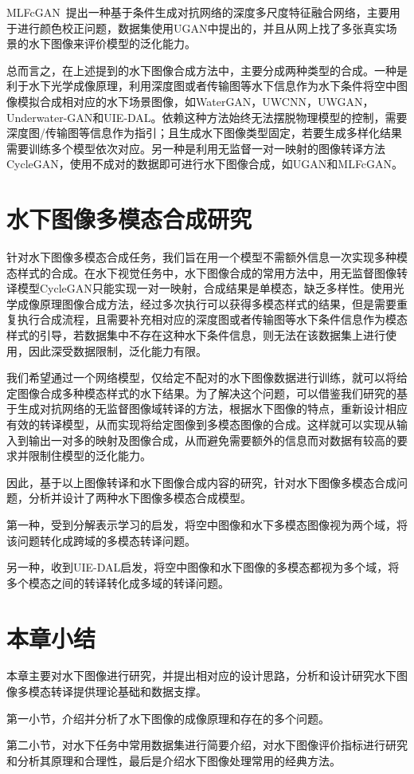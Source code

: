 MLFcGAN~\cite{liu2019mlfcgan}提出一种基于条件生成对抗网络的深度多尺度特征融合网络，主要用于进行颜色校正问题，数据集使用UGAN中提出的，并且从网上找了多张真实场景的水下图像来评价模型的泛化能力。

总而言之，在上述提到的水下图像合成方法中，主要分成两种类型的合成。一种是利于水下光学成像原理，利用深度图或者传输图等水下信息作为水下条件将空中图像模拟合成相对应的水下场景图像，如WaterGAN，UWCNN，UWGAN，Underwater-GAN和UIE-DAL。依赖这种方法始终无法摆脱物理模型的控制，需要深度图/传输图等信息作为指引；且生成水下图像类型固定，若要生成多样化结果需要训练多个模型依次对应。另一种是利用无监督一对一映射的图像转译方法CycleGAN，使用不成对的数据即可进行水下图像合成，如UGAN和MLFcGAN。

\section{水下图像多模态合成研究}
针对水下图像多模态合成任务，我们旨在用一个模型不需额外信息一次实现多种模态样式的合成。在水下视觉任务中，水下图像合成的常用方法中，用无监督图像转译模型CycleGAN只能实现一对一映射，合成结果是单模态，缺乏多样性。使用光学成像原理图像合成方法，经过多次执行可以获得多模态样式的结果，但是需要重复执行合成流程，且需要补充相对应的深度图或者传输图等水下条件信息作为模态样式的引导，若数据集中不存在这种水下条件信息，则无法在该数据集上进行使用，因此深受数据限制，泛化能力有限。

我们希望通过一个网络模型，仅给定不配对的水下图像数据进行训练，就可以将给定图像合成多种模态样式的水下结果。为了解决这个问题，可以借鉴我们研究的基于生成对抗网络的无监督图像域转译的方法，根据水下图像的特点，重新设计相应有效的转译模型，从而实现将给定图像到多模态图像的合成。这样就可以实现从输入到输出一对多的映射及图像合成，从而避免需要额外的信息而对数据有较高的要求并限制住模型的泛化能力。

因此，基于以上图像转译和水下图像合成内容的研究，针对水下图像多模态合成问题，分析并设计了两种水下图像多模态合成模型。

第一种，受到分解表示学习的启发，将空中图像和水下多模态图像视为两个域，将该问题转化成跨域的多模态转译问题。

另一种，收到UIE-DAL启发，将空中图像和水下图像的多模态都视为多个域，将多个模态之间的转译转化成多域的转译问题。


\section{本章小结}
本章主要对水下图像进行研究，并提出相对应的设计思路，分析和设计研究水下图像多模态转译提供理论基础和数据支撑。

第一小节，介绍并分析了水下图像的成像原理和存在的多个问题。

第二小节，对水下任务中常用数据集进行简要介绍，对水下图像评价指标进行研究和分析其原理和合理性，最后是介绍水下图像处理常用的经典方法。


